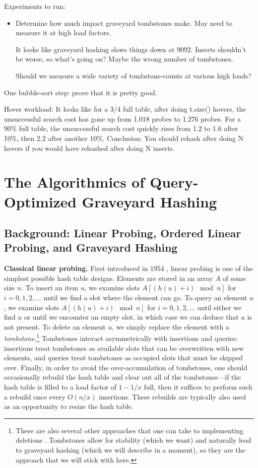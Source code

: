 \documentclass[10pt]{article}
\theoremstyle{remark}
\theoremstyle{remark}
\renewcommand{\paragraph}[1]{\vspace{.2 cm} \noindent \textbf{#1}}
\begin{document}
Experiments to run:
\begin{itemize}
\item Determine how much impact graveyard tombstones make.  May need to measure it at high load factors.

  It looks like graveyard hashing slows things down at 9092.  Inserts shouldn't be worse, so what's going on?  Maybe the wrong number of tombstones.

  Should we measure a wide variety of tombstone-counts at various high loads?
\end{itemize}

One bubble-sort step: prove that it is pretty good.

Hover workload: It looks like for a 3/4 full table, after doing t.size() hovers, the unsuccessful search cost has gone up from 1.018 probes to 1.276 probes.
For a 90\% full table, the unsuccessful search cost quickly rises from 1.2 to 1.6 after 10\%, then 2.2 after another 10\%.
Conclusion:  You should rehash after doing N hovers if you would have rehashed after doing N inserts.

\section{The Algorithmics of Query-Optimized Graveyard Hashing}

\subsection{Background: Linear Probing, Ordered Linear Probing, and Graveyard Hashing}

\paragraph{Classical linear probing.} First introduced in 1954 \cite{??}, linear probing is one of the simplest possible hash table designs. Elements are stored in an array $A$ of some size $n$. To insert an item $u$, we examine slots $A[(h(u) + i) \mod n]$ for $i = 0, 1, 2, \ldots$ until we find a slot where the element can go. To query an element $u$,  we examine slots $A[(h(u) + i) \mod n]$ for $i = 0, 1, 2, \ldots$ until either we find $u$ or until we encounter an empty slot, in which case we can deduce that $u$ is not present. To delete an element $u$, we simply replace the element with a \emph{tombstone}.\footnote{There are also several other approaches that one can take to implementing deletions \cite{...}. Tombstones allow for stability (which we want) and naturally lead to graveyard hashing (which we will describe in a moment), so they are the approach that we will stick with here.} Tombstones interact asymmetrically with insertions and queries: insertions treat tombstones as available slots that can be overwritten with new elements, and queries treat tombstones as occupied slots that must be skipped over. Finally, in order to avoid the over-accumulation of tombstones, one should occasionally rebuild the hash table and clear out all of the tombstones---if the hash table is filled to a load factor of $1 - 1/x$ full, then it suffices to perform such a rebuild once every $O(n/x)$ insertions. These rebuilds are typically also used as an opportunity to resize the hash table.
\end{document}
